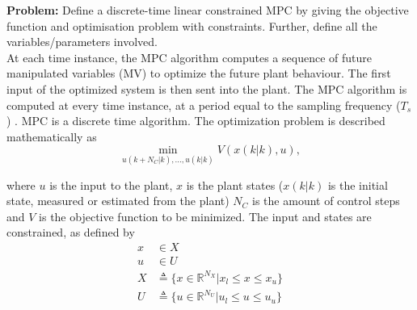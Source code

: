 \documentclass[12pt]{article}
\begin{document}
\textbf{Problem:} Define a discrete-time linear constrained MPC by giving the objective function and optimisation problem with constraints. Further, define all the variables/parameters involved. \\

At each time instance, the MPC algorithm computes a sequence of future manipulated variables (MV) to optimize the future plant behaviour. The first input of the optimized system is then sent into the plant. The MPC algorithm is computed at every time instance, at a period equal to the sampling frequency ($ T_s $) \cite{Qin.2003}. MPC is a discrete time algorithm. The optimization problem is described mathematically as
\begin{equation}
\min_{u(k+N_C|k),...,u(k|k)} V(x(k|k),u),
\end{equation}

where $ u $ is the input to the plant, $ x $ is the plant states ($ x(k|k) $ is the initial state, measured or estimated from the plant) $N_C$ is the amount of control steps and $ V $ is the objective function to be minimized. The input and states are constrained, as defined by
\begin{align*}
x &\in X \\
u &\in U \\
X &\triangleq \{x \in \mathbb{R}^{N_X}|x_l \leq x \leq x_u\} \\
U &\triangleq \{u \in \mathbb{R}^{N_U}|u_l \leq u \leq u_u\}
\end{align*}
\end{document}
